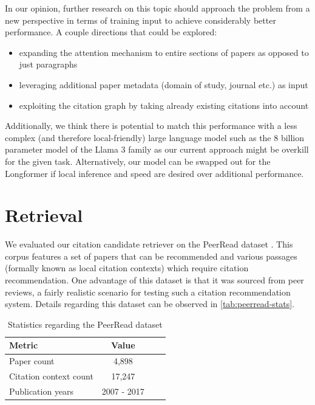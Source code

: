 \documentclass[12pt,a4paper]{report}
\begin{document}
In our opinion, further research on this topic should approach the problem from a new perspective in terms of training input to achieve considerably better performance. A couple directions that could be explored:

\begin{itemize}
    \item expanding the attention mechanism to entire sections of papers as opposed to just paragraphs
    \item leveraging additional paper metadata (domain of study, journal etc.) as input
    \item exploiting the citation graph by taking already existing citations into account
\end{itemize}

Additionally, we think there is potential to match this performance with a less complex (and therefore local-friendly) large language model such as the 8 billion parameter model of the Llama 3 family \cite{Dubey2024TheL3} as our current approach might be overkill for the given task. Alternatively, our model can be swapped out for the Longformer if local inference and speed are desired over additional performance. 

\section{Retrieval} \label{sec:retrieval-eval}

We evaluated our citation candidate retriever on the PeerRead dataset \cite{Kang2018ADO}. This corpus features a set of papers that can be recommended and various passages (formally known as local citation contexts) which require citation recommendation. One advantage of this dataset is that it was sourced from peer reviews, a fairly realistic scenario for testing such a citation recommendation system. Details regarding this dataset can be observed in \autoref{tab:peerread-stats}.

\begin{table}[th]
\centering
\small
\setlength{\tabcolsep}{12pt}
\renewcommand{\arraystretch}{1.2}
\begin{tabular}{lccc}
\toprule
\textbf{Metric} & \textbf{Value} \\
\midrule
Paper count & 4,898 \\
Citation context count & 17,247 \\
Publication years & 2007 - 2017 \\
\bottomrule
\end{tabular}
\caption{Statistics regarding the PeerRead dataset \cite{Kang2018ADO}}
\label{tab:peerread-stats}
\end{table}
\end{document}
